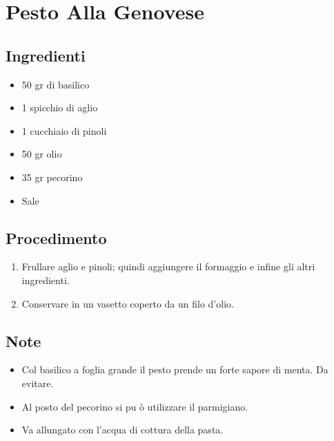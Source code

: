 \section{Pesto Alla Genovese}
\subsection{Ingredienti}
\begin{itemize}
\item 50 gr di basilico  
\item 1 spicchio di aglio  
\item 1 cucchiaio di pinoli  
\item 50 gr olio  
\item 35 gr pecorino  
\item Sale
\end{itemize}
\subsection{Procedimento}
\begin{enumerate}
\item  Frullare aglio e pinoli; quindi aggiungere il formaggio e infine gli altri ingredienti.   
\item  Conservare in un vasetto coperto da un filo d'olio.
\end{enumerate}
\subsection{Note}
\begin{itemize}
\item Col basilico a foglia grande il pesto prende un forte sapore di menta. Da evitare.  
\item Al posto del pecorino si pu ò utilizzare il parmigiano.  
\item Va allungato con l'acqua di cottura della pasta.
\end{itemize}
